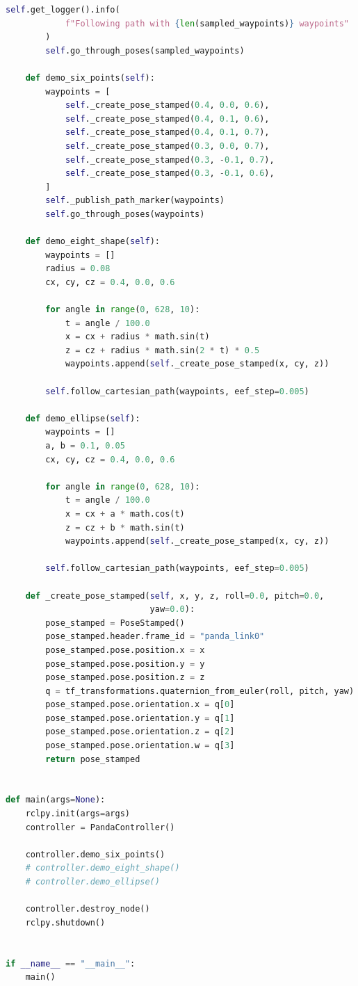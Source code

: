 \documentclass[a4paper,12pt]{ctexart}
\begin{document}
\begin{lstlisting}[language=Python, caption={panda\_controller.py完整源代码}]
        self.get_logger().info(
            f"Following path with {len(sampled_waypoints)} waypoints"
        )
        self.go_through_poses(sampled_waypoints)

    def demo_six_points(self):
        waypoints = [
            self._create_pose_stamped(0.4, 0.0, 0.6),
            self._create_pose_stamped(0.4, 0.1, 0.6),
            self._create_pose_stamped(0.4, 0.1, 0.7),
            self._create_pose_stamped(0.3, 0.0, 0.7),
            self._create_pose_stamped(0.3, -0.1, 0.7),
            self._create_pose_stamped(0.3, -0.1, 0.6),
        ]
        self._publish_path_marker(waypoints)
        self.go_through_poses(waypoints)

    def demo_eight_shape(self):
        waypoints = []
        radius = 0.08
        cx, cy, cz = 0.4, 0.0, 0.6

        for angle in range(0, 628, 10):
            t = angle / 100.0
            x = cx + radius * math.sin(t)
            z = cz + radius * math.sin(2 * t) * 0.5
            waypoints.append(self._create_pose_stamped(x, cy, z))

        self.follow_cartesian_path(waypoints, eef_step=0.005)

    def demo_ellipse(self):
        waypoints = []
        a, b = 0.1, 0.05
        cx, cy, cz = 0.4, 0.0, 0.6

        for angle in range(0, 628, 10):
            t = angle / 100.0
            x = cx + a * math.cos(t)
            z = cz + b * math.sin(t)
            waypoints.append(self._create_pose_stamped(x, cy, z))

        self.follow_cartesian_path(waypoints, eef_step=0.005)

    def _create_pose_stamped(self, x, y, z, roll=0.0, pitch=0.0,
                             yaw=0.0):
        pose_stamped = PoseStamped()
        pose_stamped.header.frame_id = "panda_link0"
        pose_stamped.pose.position.x = x
        pose_stamped.pose.position.y = y
        pose_stamped.pose.position.z = z
        q = tf_transformations.quaternion_from_euler(roll, pitch, yaw)
        pose_stamped.pose.orientation.x = q[0]
        pose_stamped.pose.orientation.y = q[1]
        pose_stamped.pose.orientation.z = q[2]
        pose_stamped.pose.orientation.w = q[3]
        return pose_stamped


def main(args=None):
    rclpy.init(args=args)
    controller = PandaController()

    controller.demo_six_points()
    # controller.demo_eight_shape()
    # controller.demo_ellipse()

    controller.destroy_node()
    rclpy.shutdown()


if __name__ == "__main__":
    main()
\end{lstlisting}
\end{document}
